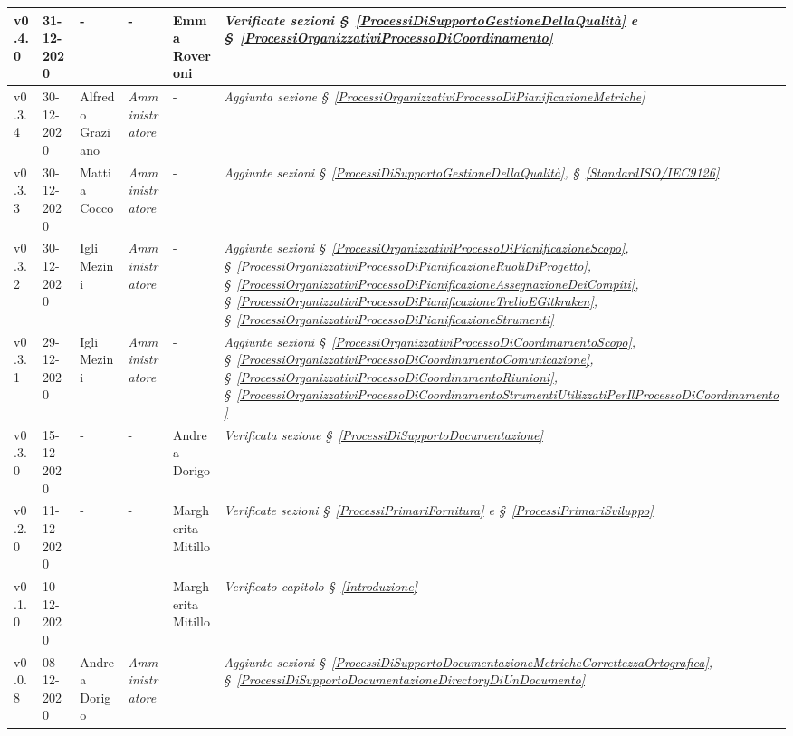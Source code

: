 {\begin{center}
\begin{longtable}[c]{|p{2cm-1\tabcolsep}|p{2cm}|p{3cm-2\tabcolsep}|p{3cm-1.5\tabcolsep}|p{}|p{4cm-2\tabcolsep}|}
		\hline
		\centering v0.4.0 & 31-12-2020 & \centering - & \centering - & Emma Roveroni & \textit{Verificate sezioni \S~\ref{ProcessiDiSupportoGestioneDellaQualità} e \S~\ref{ProcessiOrganizzativiProcessoDiCoordinamento} }  \\
		\hline
		\centering v0.3.4 & 30-12-2020 & Alfredo Graziano & \centering \textit{Amministratore} & \centering - & \textit{Aggiunta sezione \S~\ref{ProcessiOrganizzativiProcessoDiPianificazioneMetriche}} \\
		\hline
		\centering v0.3.3 & 30-12-2020 & Mattia Cocco & \centering \textit{Amministratore} & \centering - & \textit{Aggiunte sezioni \S~\ref{ProcessiDiSupportoGestioneDellaQualità}, \S~\ref{StandardISO/IEC9126} } \\
		\hline
		\centering v0.3.2 & 30-12-2020 & Igli Mezini & \centering \textit{Amministratore} & \centering - & \textit{Aggiunte sezioni \S~\ref{ProcessiOrganizzativiProcessoDiPianificazioneScopo}, \S~\ref{ProcessiOrganizzativiProcessoDiPianificazioneRuoliDiProgetto}, \S~\ref{ProcessiOrganizzativiProcessoDiPianificazioneAssegnazioneDeiCompiti}, \S~\ref{ProcessiOrganizzativiProcessoDiPianificazioneTrelloEGitkraken}, \S~\ref{ProcessiOrganizzativiProcessoDiPianificazioneStrumenti} } \\
		\hline
		\centering v0.3.1 & 29-12-2020 & Igli Mezini & \centering \textit{Amministratore} & \centering - & \textit{Aggiunte sezioni \S~\ref{ProcessiOrganizzativiProcessoDiCoordinamentoScopo}, \S~\ref{ProcessiOrganizzativiProcessoDiCoordinamentoComunicazione}, \S~\ref{ProcessiOrganizzativiProcessoDiCoordinamentoRiunioni}, \S~\ref{ProcessiOrganizzativiProcessoDiCoordinamentoStrumentiUtilizzatiPerIlProcessoDiCoordinamento} } \\
		\hline
		\centering v0.3.0 & 15-12-2020 & \centering - & \centering - & Andrea Dorigo & 
		\textit{Verificata sezione \S~\ref{ProcessiDiSupportoDocumentazione}} \\
		\hline
		\centering v0.2.0 & 11-12-2020 & \centering - & \centering - & Margherita Mitillo & \textit{Verificate sezioni \S~\ref{ProcessiPrimariFornitura} e \S~\ref{ProcessiPrimariSviluppo} } \\
		\hline
		\centering v0.1.0 & 10-12-2020 & \centering - & \centering - & Margherita Mitillo & \textit{Verificato capitolo \S~\ref{Introduzione}} \\
		\hline
		\centering v0.0.8 & 08-12-2020 & Andrea Dorigo & \centering \textit{Amministratore} & \centering - & \textit{Aggiunte sezioni \S~\ref{ProcessiDiSupportoDocumentazioneMetricheCorrettezzaOrtografica}, \S~\ref{ProcessiDiSupportoDocumentazioneDirectoryDiUnDocumento}} \\

\end{longtable}
\end{center}}
